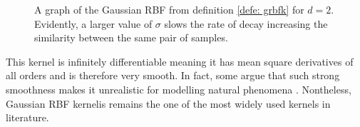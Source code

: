 \begin{figure}[H]
    \centering
    \quad
    \caption{A graph of the Gaussian RBF from definition \ref{defe: grbfk} for $d=2$. Evidently, a larger value of $\sigma$ slows the rate of decay increasing the similarity between the same pair of samples.}%
    \label{fig: grbfk_graph_1}
\end{figure}

This kernel is infinitely differentiable meaning it has mean square derivatives of all orders and is therefore very smooth. In fact, some argue that such strong smoothness makes it unrealistic for modelling natural phenomena \cite{RasmussenCarlEdward2006Gpfm,SteinMichaelL1999IoSD}. Nontheless, Gaussian RBF kernelis remains the one of the most widely used kernels in literature.